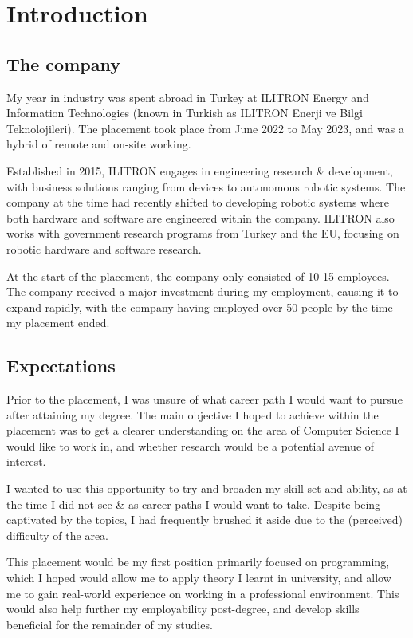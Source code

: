 \chapter{Introduction}

\section{The company}

My year in industry was spent abroad in Turkey at ILITRON Energy and Information Technologies (known
in Turkish as ILITRON Enerji ve Bilgi Teknolojileri). The placement took place from June 2022 to May
2023, and was a hybrid of remote and on-site working.

Established in 2015, ILITRON engages in engineering research \& development, with business solutions
ranging from  devices to autonomous robotic systems. The company at the time had recently
shifted to developing robotic systems where both hardware and software are engineered within the
company. ILITRON also works with government research programs from Turkey and the EU, focusing on
robotic hardware and software research.

At the start of the placement, the company only consisted of 10-15 employees. The company received a
major investment during my employment, causing it to expand rapidly, with the company having
employed over 50 people by the time my placement ended.

\section{Expectations}

Prior to the placement, I was unsure of what career path I would want to pursue after attaining my
degree. The main objective I hoped to achieve within the placement was to get a clearer
understanding on the area of Computer Science I would like to work in, and whether research would be
a potential avenue of interest.

I wanted to use this opportunity to try and broaden my skill set and ability, as at the time I did
not see  \&  as career paths I would want to take. Despite being captivated by the
topics, I had frequently brushed it aside due to the (perceived) difficulty of the area.

This placement would be my first position primarily focused on programming, which I hoped would
allow me to apply theory I learnt in university, and allow me to gain real-world experience on
working in a professional environment. This would also help further my employability post-degree,
and develop skills beneficial for the remainder of my studies.

